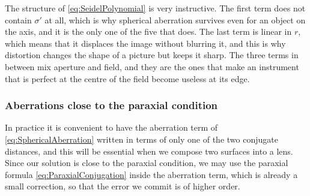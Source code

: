                     The structure of \ref{eq:SeidelPolynomial} is very instructive. The first term does not contain $\sigma'$ at all, which is why spherical aberration survives even for an object on the axis, and it is the only one of the five that does. The last term is linear in $r$, which means that it displaces the image without blurring it, and this is why distortion changes the shape of a picture but keeps it sharp. The three terms in between mix aperture and field, and they are the ones that make an instrument that is perfect at the centre of the field become useless at its edge.

                \subsubsection{Aberrations close to the paraxial condition}

                    In practice it is convenient to have the aberration term of \ref{eq:SphericalAberration} written in terms of only one of the two conjugate distances, and this will be essential when we compose two surfaces into a lens. Since our solution is close to the paraxial condition, we may use the paraxial formula \ref{eq:ParaxialConjugation} inside the aberration term, which is already a small correction, so that the error we commit is of higher order.

